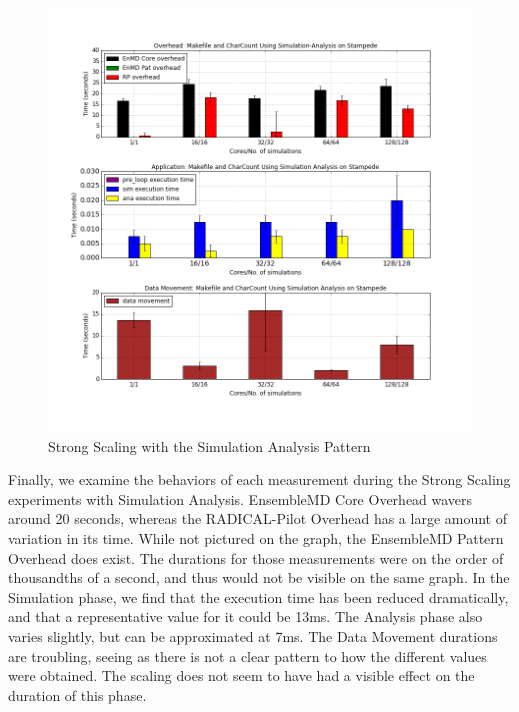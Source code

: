 \documentclass[]{article}
\begin{document}
		\begin{figure}[h!]
			\centering
			\includegraphics[scale=.30]{iteration_3/sa_strong_scaling.png}
			\caption{Strong Scaling with the Simulation Analysis Pattern}
			\label{fig:sa_strong_scaling}
		\end{figure}
		
		Finally, we examine the behaviors of each measurement during the Strong Scaling experiments with Simulation Analysis. EnsembleMD Core Overhead wavers around 20 seconds, whereas the RADICAL-Pilot Overhead has a large amount of variation in its time. While not pictured on the graph, the EnsembleMD Pattern Overhead does exist. The durations for those measurements were on the order of thousandths of a second, and thus would not be visible on the same graph.
		In the Simulation phase, we find that the execution time has been reduced dramatically, and that a representative value for it could be 13ms. The Analysis phase also varies slightly, but can be approximated at 7ms.
		The Data Movement durations are troubling, seeing as there is not a clear pattern to how the different values were obtained. The scaling does not seem to have had a visible effect on the duration of this phase.
\end{document}
